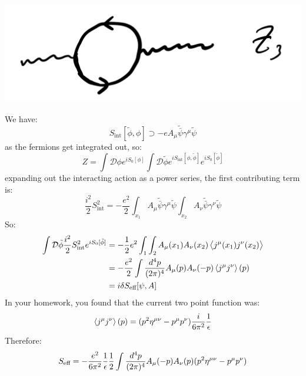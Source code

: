\begin{center}
    \includegraphics[scale=0.35]{Lectures/Images/lec11-Z3.png}
\end{center}

We have:
\begin{equation}
    S_{\text{int}}[\tilde{\phi}, \phi] \supset -e A_\mu \tilde{\bar{\psi}}\gamma^\mu \tilde{\psi}
\end{equation}
as the fermions get integrated out, so:
\begin{equation}
    Z = \int \mathcal{D}\phi e^{iS_0[\phi]}\int \mathcal{D}\tilde{\phi}e^{iS_{\text{int}}[\phi, \tilde{\phi}]}e^{iS_0[\tilde{\phi}]}
\end{equation}
expanding out the interacting action as a power series, the first contributing term is:
\begin{equation}
    \frac{i^2}{2}S_{\text{int}}^2 = -\frac{e^2}{2}\int_{x_1}A_\mu \tilde{\bar{\psi}}\gamma^\mu \tilde{\psi}\int_{x_2}A_\nu \tilde{\bar{\psi}}\gamma^\nu \tilde{\psi}
\end{equation}
So:
\begin{equation}
    \begin{split}
        \int \mathcal{D}\tilde{\phi}\frac{i^2}{2}S_{\text{int}}^2e^{iS_0[\tilde{\phi}]} &= -\frac{1}{2}e^2\int_1\int_2 A_\mu(x_1)A_\nu(x_2)\left< j^\mu(x_1)j^\nu(x_2) \right>
        \\ &= -\frac{e^2}{2}\int \frac{d^4p}{(2\pi)^4}A_\mu(p)A_\nu(-p)\left< j^\mu j^\nu \right>(p)
        \\ &= i\delta S_{\text{eff}}[\psi, A]
    \end{split}
\end{equation}
In your homework, you found that the current two point function was:
\begin{equation}
    \left< j^\mu j^\nu \right>(p) = (p^2\eta^{\mu\nu} - p^\mu p^\nu)\frac{i}{6\pi^2}\frac{1}{\epsilon}
\end{equation}
Therefore:
\begin{equation}
    S_{\text{eff}} = -\frac{e^2}{6\pi^2}\frac{1}{\epsilon}\frac{1}{2}\int\frac{d^4p}{(2\pi)^4}A_\mu(-p)A_\nu(p)(p^2\eta^{\mu\nu} - p^\mu p^\nu)
\end{equation}
